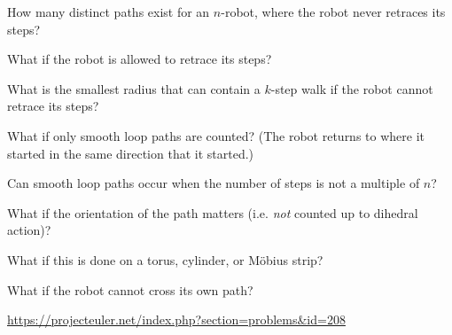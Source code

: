 \documentclass{article}
\begin{document}
\begin{question}
  How many distinct paths exist for an $n$-robot, where the robot never
  retraces its steps?
\end{question}
\begin{related}
  \item What if the robot is allowed to retrace its steps?
  \item What is the smallest radius that can contain a $k$-step walk if the robot
    cannot retrace its steps?
  \item What if only smooth loop paths are counted?
    (The robot returns to where it started in the same direction that it
    started.)
  \item Can smooth loop paths occur when the number of steps is not a multiple
    of $n$?
  \item What if the orientation of the path matters (i.e. \textit{not} counted
    up to dihedral action)?
  \item What if this is done on a torus, cylinder, or M\"obius strip?
  \item What if the robot cannot cross its own path?
\end{related}
\begin{references}
  \item \url{https://projecteuler.net/index.php?section=problems&id=208}
\end{references}
\end{document}
